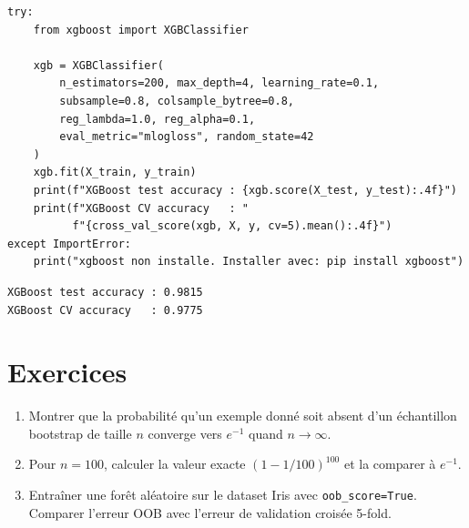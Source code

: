 \begin{codeblock}[title=\textbf{XGBoost (si disponible)}]
\begin{verbatim}
try:
    from xgboost import XGBClassifier

    xgb = XGBClassifier(
        n_estimators=200, max_depth=4, learning_rate=0.1,
        subsample=0.8, colsample_bytree=0.8,
        reg_lambda=1.0, reg_alpha=0.1,
        eval_metric="mlogloss", random_state=42
    )
    xgb.fit(X_train, y_train)
    print(f"XGBoost test accuracy : {xgb.score(X_test, y_test):.4f}")
    print(f"XGBoost CV accuracy   : "
          f"{cross_val_score(xgb, X, y, cv=5).mean():.4f}")
except ImportError:
    print("xgboost non installe. Installer avec: pip install xgboost")
\end{verbatim}
\end{codeblock}

\begin{codeoutput}
\begin{verbatim}
XGBoost test accuracy : 0.9815
XGBoost CV accuracy   : 0.9775
\end{verbatim}
\end{codeoutput}

\section{Exercices}
\label{sec:exercises-ch7}

\begin{exercice}
\begin{enumerate}
  \item Montrer que la probabilit\'e qu'un exemple donn\'e soit absent d'un
    \'echantillon bootstrap de taille $n$ converge vers $e^{-1}$ quand
    $n \to \infty$.
  \item Pour $n = 100$, calculer la valeur exacte
    $(1 - 1/100)^{100}$ et la comparer \`a $e^{-1}$.
  \item Entra\^iner une for\^et al\'eatoire sur le dataset Iris avec
    \texttt{oob\_score=True}. Comparer l'erreur OOB avec l'erreur de
    validation crois\'ee 5-fold.
\end{enumerate}
\end{exercice}

